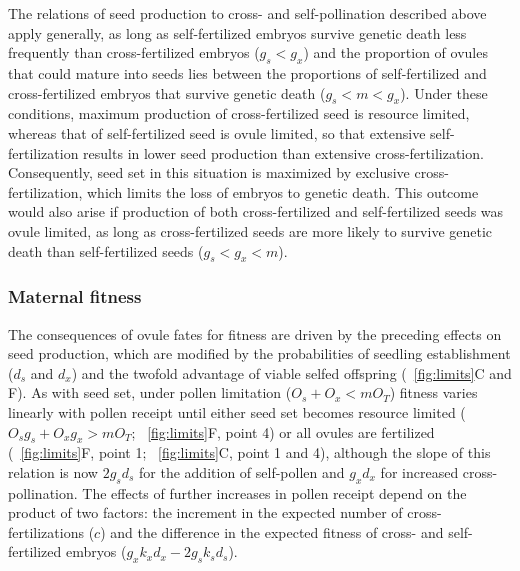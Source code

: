 \documentclass[letterpaper,titlepage]{scrartcl}
\begin{document}
The relations of seed production to cross- and self-pollination
described above apply generally, as long as self-fertilized embryos
survive genetic death less frequently than cross-fertilized embryos
($g_{s} < g_{x}$) and the proportion of ovules that could mature into
seeds lies between the proportions of self-fertilized and
cross-fertilized embryos that survive genetic death ($g_{s} < m < 
g_{x}$). Under these conditions, maximum production of
cross-fertilized seed is resource limited, whereas that of
self-fertilized seed is ovule limited, so that extensive
self-fertilization results in lower seed production than extensive
cross-fertilization. Consequently, seed set in this situation is
maximized by exclusive cross-fertilization, which limits the loss of
embryos to genetic death. This outcome would also arise if production
of both cross-fertilized and self-fertilized seeds was ovule limited,
as long as cross-fertilized seeds are more likely to survive genetic
death than self-fertilized seeds ($g_{s}<g_{x}<m$).

\subsubsection{Maternal fitness}
The consequences of ovule fates for fitness are driven by the
preceding effects on seed production, which are modified by the
probabilities of seedling establishment ($d_{s}$ and $d_{x}$) and the
twofold advantage of viable selfed offspring
({\fref}~\ref{fig:limits}C and F). As with seed set, under pollen
limitation ($O_{s} + O_{x} < mO_{T}$) fitness varies linearly with
pollen receipt until either seed set becomes resource limited
($O_{s}g_{s} + O_{x}g_{x} > mO_{T}$; {\fref}~\ref{fig:limits}F, point
4) or all ovules are fertilized ({\fref}~\ref{fig:limits}F, point 1;
{\fref}~\ref{fig:limits}C, point 1 and 4), although the slope of this
relation is now $2g_{s}d_{s}$ for the addition of self-pollen and
$g_{x}d_{x}$ for increased cross-pollination. The effects of further
increases in pollen receipt depend on the product of two factors: the
increment in the expected number of cross-fertilizations ($c$) and the
difference in the expected fitness of cross- and self-fertilized
embryos ($g_{x}k_{x}d_{x} - 2g_{s}k_{s}d_{s}$).
\end{document}
